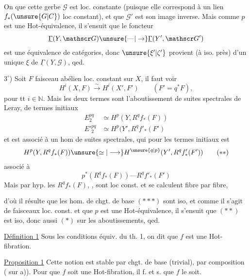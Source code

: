 
On  que cette gerbe $\mathscr G$ est loc. constante
(puisque elle correspond à un lien $f_*(\unsure{G|C})$ loc constant),
et que $\mathscr G'$ est son image inverse. Mais comme
$p$ est une Hot-équivalence, il s'ensuit que
le foncteur
\[
\underline{\Gamma}(Y,\mathscr G)\unsure{\text{---}|\to}\underline{\Gamma}(Y',\mathscr G')
\]
est une équivalence de catégories, donc $\unsure{\xi'|\zeta'}$
provient (à iso. près) d'un unique $\xi$ de $\underline{\Gamma}(Y,\mathscr G)$,
qed.

$3^\circ$) Soit $F$ faisceau abélien loc. constant sur $X$,
il faut voir
\[
H^i(X,F)\xrightarrow{\sim} H^i(X',F')\qquad (F'=q^*F),\tag*{$(*)$}
\]
pour tt $i\in\mathbb N$. Mais  les deux termes sont
l'aboutissement de suites spectrales de
Leray, de termes initiaux
\[
\begin{aligned}
E_2^{pq}&\simeq H^p(Y,R^q f_*(F))\\
E'{}^{pq}_2&\simeq H^p(Y',R^q f'_*(F')
\end{aligned}
\]
et  est associé à un hom de suites
spectrales, qui pour les termes initiaux est
\[
H^p(Y,R^q f_*(F))\unsure{\simeq|\longrightarrow}H^{\unsure{q|p}}(Y',R^q f'_*(F'))\tag*{$(**)$}
\]
associé à
\[
p^*(R^q f_*(F))\text{---}R^q f'_*(F')\tag*{$(***)$}
\]
Mais par hyp. les $R^q f_*(F)$, , sont loc const.
et se calculent fibre par fibre,


d'où il résulte que les hom. de chgt. de base
$(***)$ sont iso, et comme il s'agit de
faisceaux loc. const. et que $p$ est une
Hot-équivalence, il s'ensuit que $(**)$ est
iso, donc aussi $(*)$ sur les aboutissements,
qed.

\uline{Définition 1} Sous les conditions équiv. du th. 1,
on dit que $f$ est une Hot-fibration.

\uline{Proposition 1} Cette notion est stable par chgt. de
base (trivial), par composition ( sur a)). Pour
que $f$ soit une Hot-fibration, il f. et s. que $f$
le soit.


